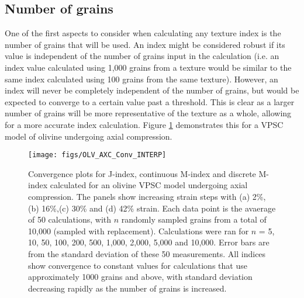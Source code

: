 \documentclass[a4paper,12pt]{report}
\numberwithin{equation}{chapter}
\begin{document}
\subsection{Number of grains}

One of the first aspects to consider when calculating any texture index is the number of grains that will be used. An index might be considered robust if its value is independent of the number of grains input in the calculation (i.e. an index value calculated using 1,000 grains from a texture would be similar to the same index calculated using 100 grains from the same texture). However, an index will never be completely independent of the number of grains, but would be expected to converge to a certain value past a threshold. This is clear as a larger number of grains will be more representative of the texture as a whole, allowing for a more accurate index calculation. Figure \ref{fig:OLV_AXC_n_conv} demonstrates this for a VPSC model of olivine undergoing axial compression. 

\begin{figure}[bht]
  \centering
    \texttt{[image: figs/OLV\_AXC\_Conv\_INTERP]}
  \caption[Convergence with no. grains (olivine VPSC)]{Convergence plots for J-index, continuous M-index and discrete M-index calculated for an olivine VPSC model undergoing axial compression. The panels show increasing strain steps with (a) 2\%, (b) 16\%,(c) 30\% and (d) 42\% strain. Each data point is the avaerage of 50 calculations, with $n$ randomly sampled grains from a total of 10,000 (sampled with replacement). Calculations were ran for $n$ = 5, 10, 50, 100, 200, 500, 1,000, 2,000, 5,000 and 10,000. Error bars are from the standard deviation of these 50 measurements. All indices show convergence to constant values for calculations that use approximately 1000 grains and above, with standard deviation decreasing rapidly as the number of grains is increased.}
  \label{fig:OLV_AXC_n_conv}
\end{figure}
\end{document}
